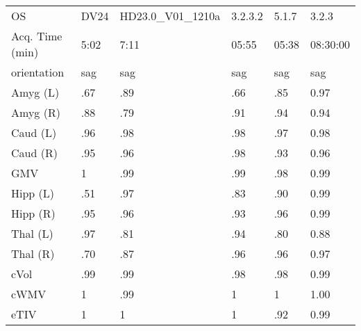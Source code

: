 \begin{table}
\begin{tabular}{llllll}
OS                    &                      DV24 &            HD23.0\_V01\_1210a &               3.2.3.2 &              5.1.7 &                3.2.3 \\
Acq. Time (min)       &               5:02 &  7:11 &              05:55 &           05:38 &             08:30:00 \\
orientation           &               sag &                         sag &                   sag &                sag &                  sag \\
Amyg (L)              &                   .67 &                        .89 &                  .66 &               .85 &                 0.97 \\
Amyg (R)              &                   .88 &                        .79 &                  .91 &               .94 &                 0.94 \\
Caud (L)              &                   .96 &                        .98 &                  .98 &               .97 &                 0.98 \\
Caud (R)              &                   .95 &                        .96 &                  .98 &               .93 &                 0.96 \\
GMV                   &                   1 &                        .99 &                  .99 &               .98 &                 0.99 \\
Hipp (L)              &                   .51 &                        .97 &                  .83 &               .90 &                 0.99 \\
Hipp (R)              &                   .95 &                        .96 &                  .93 &               .96 &                 0.99 \\
Thal (L)              &                   .97 &                        .81 &                  .94 &               .80 &                 0.88 \\
Thal (R)              &                   .70 &                        .87 &                  .96 &               .96 &                 0.97 \\
cVol                  &                   .99 &                        .99 &                  .98 &               .98 &                 0.99 \\
cWMV                  &                   1 &                        .99 &                  1 &               1 &                 1.00 \\
eTIV                  &                   1 &                        1 &                  1 &               .92 &                 0.99 \\

\end{tabular}
\end{table}
